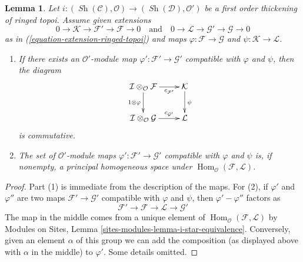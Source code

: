 \documentclass[10pt,a4paper]{amsart}
\theoremstyle{plain}
\newtheorem{lemma}[subsection]{Lemma}
\theoremstyle{definition}
\theoremstyle{remark}
\numberwithin{equation}{subsection}
\def\Hom{\mathop{\mathrm{Hom}}\nolimits}
\def\Sh{\mathop{\mathit{Sh}}\nolimits}
\begin{document}
\begin{lemma}
\label{lemma-inf-map-ringed-topoi}
Let $i : (\Sh(\mathcal{C}), \mathcal{O}) \to (\Sh(\mathcal{D}), \mathcal{O}')$
be a first order thickening of ringed topoi. Assume given
extensions
$$
0 \to \mathcal{K} \to \mathcal{F}' \to \mathcal{F} \to 0
\quad\text{and}\quad
0 \to \mathcal{L} \to \mathcal{G}' \to \mathcal{G} \to 0
$$
as in (\ref{equation-extension-ringed-topoi})
and maps $\varphi : \mathcal{F} \to \mathcal{G}$ and
$\psi : \mathcal{K} \to \mathcal{L}$.
\begin{enumerate}
\item If there exists an $\mathcal{O}'$-module
map $\varphi' : \mathcal{F}' \to \mathcal{G}'$ compatible with $\varphi$
and $\psi$, then the diagram
$$
\xymatrix{
\mathcal{I} \otimes_\mathcal{O} \mathcal{F}
\ar[r]_-{c_{\mathcal{F}'}} \ar[d]_{1 \otimes \varphi} &
\mathcal{K} \ar[d]^\psi \\
\mathcal{I} \otimes_\mathcal{O} \mathcal{G}
\ar[r]^-{c_{\mathcal{G}'}} &
\mathcal{L}
}
$$
is commutative.
\item The set of $\mathcal{O}'$-module
maps $\varphi' : \mathcal{F}' \to \mathcal{G}'$ compatible with $\varphi$
and $\psi$ is, if nonempty, a principal homogeneous space under
$\Hom_\mathcal{O}(\mathcal{F}, \mathcal{L})$.
\end{enumerate}
\end{lemma}

\begin{proof}
Part (1) is immediate from the description of the maps.
For (2), if $\varphi'$ and $\varphi''$ are two maps
$\mathcal{F}' \to \mathcal{G}'$ compatible with $\varphi$
and $\psi$, then $\varphi' - \varphi''$ factors as
$$
\mathcal{F}' \to \mathcal{F} \to \mathcal{L} \to \mathcal{G}'
$$
The map in the middle comes from a unique element of
$\Hom_\mathcal{O}(\mathcal{F}, \mathcal{L})$ by
Modules on Sites, Lemma \ref{sites-modules-lemma-i-star-equivalence}.
Conversely, given an element $\alpha$ of this group we can add the
composition (as displayed above with $\alpha$ in the middle)
to $\varphi'$. Some details omitted.
\end{proof}
\end{document}

